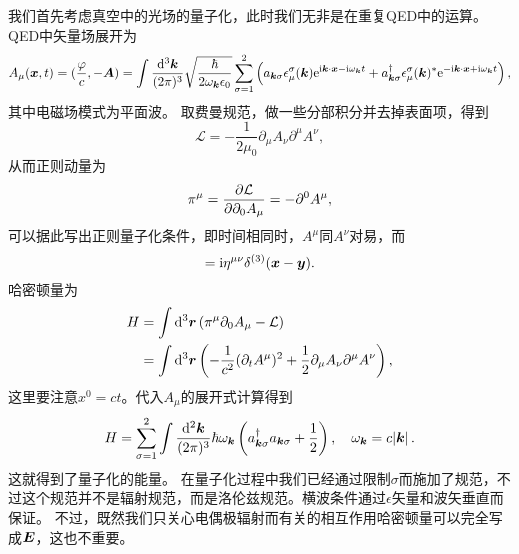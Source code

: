 我们首先考虑真空中的光场的量子化，此时我们无非是在重复QED中的运算。
QED中矢量场展开为
\begin{equation}
    A_\mu(\vb*{x}, t) = (\frac{\varphi}{c}, - \vb*{A}) = \int \frac{\dd[3]{\vb*{k}}}{(2\pi)^3} \sqrt{\frac{\hbar}{2\omega_{\vb*{k}} \epsilon_0}} \sum_{\sigma=1}^2 \left( a_{\vb*{k} \sigma} \epsilon_\mu^\sigma(\vb*{k}) \mathrm{e}^{\mathrm{i} \vb*{k} \cdot \vb*{x} - \mathrm{i} \omega_{\vb*{k}} t} + a_{\vb*{k} \sigma}^\dagger \epsilon_\mu^\sigma(\vb*{k})^* \mathrm{e}^{- \mathrm{i} \vb*{k} \cdot \vb*{x} + \mathrm{i} \omega_{\vb*{k}} t} \right),
\end{equation}
其中电磁场模式为平面波。
取费曼规范，做一些分部积分并去掉表面项，得到
\begin{equation}
    \mathcal{L} = - \frac{1}{2 \mu_0} \partial_\mu A_\nu \partial^\mu A^\nu,
\end{equation}
从而正则动量为
\begin{equation}
    \pi^\mu = \pdv{\mathcal{L}}{\partial_0 A_\mu} = - \partial^0 A^\mu,
\end{equation}
可以据此写出正则量子化条件，即时间相同时，$A^\mu$同$A^\nu$对易，而
\begin{equation}
    [A^\mu(\vb*{x}, t), \pi^\mu(\vb*{y}, t)] = \ii \eta^{\mu \nu} \delta^{(3)}(\vb*{x} - \vb*{y}).
\end{equation}
哈密顿量为
\[
    \begin{aligned}
        H &= \int \dd[3]{\vb*{r}} (\pi^\mu \partial_0 A_\mu - \mathcal{L}) \\
        &= \int \dd[3]{\vb*{r}} \left( - \frac{1}{c^2} (\partial_t A^\mu)^2 + \frac{1}{2} \partial_\mu A_\nu \partial^\mu A^\nu \right),
    \end{aligned}
\]
这里要注意$x^0 = c t$。代入$A_\mu$的展开式计算得到
\begin{equation}
    H = \sum_{\sigma=1}^2 \int \frac{\dd[2]{\vb*{k}}}{(2\pi)^3} \hbar \omega_{\vb*{k}} \left( a^\dagger_{\vb*{k} \sigma} a_{\vb*{k} \sigma} + \frac{1}{2} \right), \quad \omega_{\vb*{k}} = c \abs*{\vb*{k}}.
\end{equation}
这就得到了量子化的能量。
在量子化过程中我们已经通过限制$\sigma$而施加了规范，不过这个规范并不是辐射规范，而是洛伦兹规范。横波条件通过$\epsilon$矢量和波矢垂直而保证。
不过，既然我们只关心电偶极辐射而有关的相互作用哈密顿量可以完全写成$\vb*{E}$，这也不重要。

